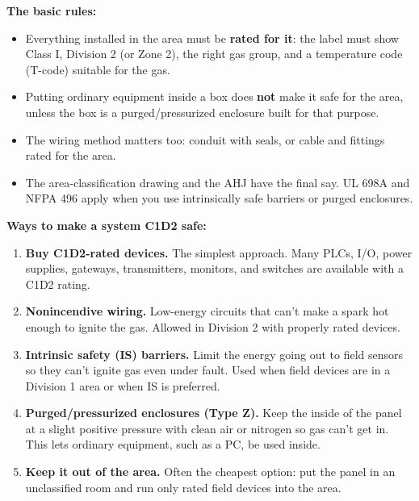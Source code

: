 \textbf{The basic rules:}
\begin{itemize}[itemsep=2pt]
  \item Everything installed in the area must be \textbf{rated for it}: the label must show Class I, Division 2 (or Zone 2), the right gas group, and a temperature code (T-code) suitable for the gas.
  \item Putting ordinary equipment inside a box does \textbf{not} make it safe for the area, unless the box is a purged/pressurized enclosure built for that purpose.
  \item The wiring method matters too: conduit with seals, or cable and fittings rated for the area.
  \item The area-classification drawing and the AHJ have the final say. UL 698A and NFPA 496 apply when you use intrinsically safe barriers or purged enclosures.
\end{itemize}

\textbf{Ways to make a system C1D2 safe:}
\begin{enumerate}[itemsep=2pt]
  \item \textbf{Buy C1D2-rated devices.} The simplest approach. Many PLCs, I/O, power supplies, gateways, transmitters, monitors, and switches are available with a C1D2 rating.
  \item \textbf{Nonincendive wiring.} Low-energy circuits that can't make a spark hot enough to ignite the gas. Allowed in Division 2 with properly rated devices.
  \item \textbf{Intrinsic safety (IS) barriers.} Limit the energy going out to field sensors so they can't ignite gas even under fault. Used when field devices are in a Division 1 area or when IS is preferred.
  \item \textbf{Purged/pressurized enclosures (Type Z).} Keep the inside of the panel at a slight positive pressure with clean air or nitrogen so gas can't get in. This lets ordinary equipment, such as a PC, be used inside.
  \item \textbf{Keep it out of the area.} Often the cheapest option: put the panel in an unclassified room and run only rated field devices into the area.
\end{enumerate}

